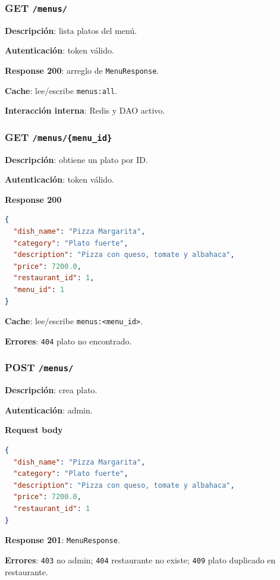 \documentclass[12pt,letterpaper]{article}
\def\codefile#1{\nolinkurl{#1}}
\def\methodget{\textbf{\color{blue!60!black}GET}}
\def\methodpost{\textbf{\color{green!45!black}POST}}
\begin{document}
\subsubsection{\methodget{} \codefile{/menus/}}

\textbf{Descripción}: lista platos del menú.

\textbf{Autenticación}: token válido.

\textbf{Response 200}: arreglo de \codefile{MenuResponse}.

\textbf{Cache}: lee/escribe \codefile{menus:all}.

\textbf{Interacción interna}: Redis y DAO activo.

\subsubsection{\methodget{} \codefile{/menus/\{menu\_id\}}}

\textbf{Descripción}: obtiene un plato por ID.

\textbf{Autenticación}: token válido.

\textbf{Response 200}
\begin{lstlisting}[language=json]
{
  "dish_name": "Pizza Margarita",
  "category": "Plato fuerte",
  "description": "Pizza con queso, tomate y albahaca",
  "price": 7200.0,
  "restaurant_id": 1,
  "menu_id": 1
}
\end{lstlisting}

\textbf{Cache}: lee/escribe \codefile{menus:<menu\_id>}.

\textbf{Errores}: \codefile{404} plato no encontrado.

\subsubsection{\methodpost{} \codefile{/menus/}}

\textbf{Descripción}: crea plato.

\textbf{Autenticación}: admin.

\textbf{Request body}
\begin{lstlisting}[language=json]
{
  "dish_name": "Pizza Margarita",
  "category": "Plato fuerte",
  "description": "Pizza con queso, tomate y albahaca",
  "price": 7200.0,
  "restaurant_id": 1
}
\end{lstlisting}

\textbf{Response 201}: \codefile{MenuResponse}.

\textbf{Errores}: \codefile{403} no admin; \codefile{404} restaurante no existe; \codefile{409} plato duplicado en restaurante.
\end{document}
